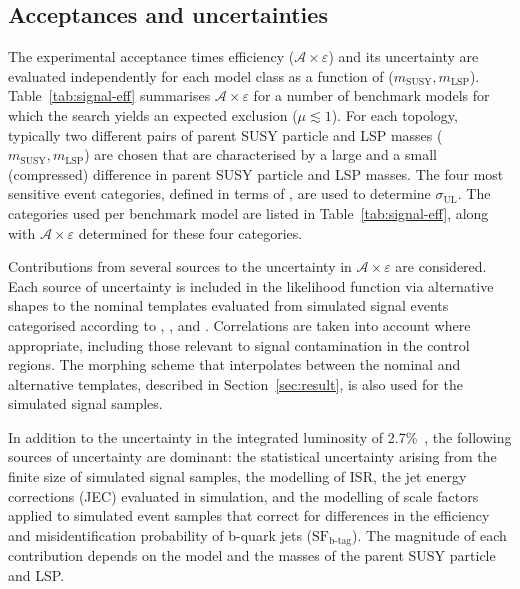 \subsection{Acceptances and uncertainties}

The experimental acceptance times efficiency
($\mathcal{A}\times\varepsilon$) and its uncertainty are evaluated
independently for each model class as a function of ($m_\text{SUSY},
m_\text{LSP}$). Table~\ref{tab:signal-eff} summarises
$\mathcal{A}\times\varepsilon$ for a number of benchmark models for
which the search yields an expected exclusion ($\mu \lesssim 1$). For
each topology, typically two different pairs of parent SUSY particle and
LSP masses ($m_\text{SUSY}, m_\text{LSP}$) are chosen that are
characterised by a large and a small (\ie compressed) difference
in parent SUSY particle and LSP masses. The four most sensitive event
categories, defined in terms of \njet, are used to determine
$\sigma_\text{UL}$. The categories used per benchmark model are listed
in Table~\ref{tab:signal-eff}, along with
$\mathcal{A}\times\varepsilon$ determined for these four categories.

Contributions from several sources to the uncertainty in
$\mathcal{A}\times\varepsilon$ are considered. Each source of
uncertainty is included in the likelihood function via alternative
shapes to the nominal \HTmiss templates evaluated from simulated
signal events categorised according to \njet, \nb, and
\scalht. Correlations are taken into account where appropriate,
including those relevant to signal contamination in the control
regions. The morphing scheme that interpolates between the nominal and
alternative \HTmiss templates, described in Section~\ref{sec:result},
is also used for the simulated signal samples.

In addition to the uncertainty in the integrated luminosity of
2.7\%~\cite{CMS:2016eto}, the following sources of uncertainty are
dominant: the statistical uncertainty arising from the finite size of
simulated signal samples, the modelling of ISR, the jet energy
corrections (JEC) evaluated in simulation, and the modelling of scale
factors applied to simulated event samples that correct for
differences in the efficiency and misidentification probability of
b-quark jets ($\text{SF}_\text{b-tag}$). The magnitude of each
contribution depends on the model and the masses of the parent
SUSY particle and LSP.


